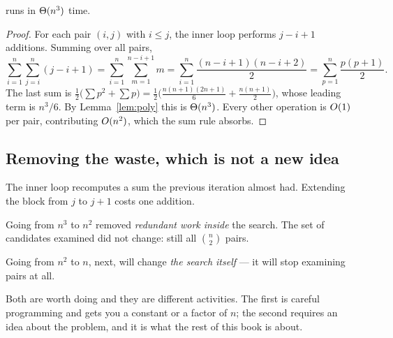 \begin{theorem}\label{thm:brute3}
 runs in $\Theta(n^{3})$ time.
\end{theorem}

\begin{proof}
For each pair $(i,j)$ with $i \le j$, the inner loop performs $j - i + 1$
additions. Summing over all pairs,
\[ \sum_{i=1}^{n}\sum_{j=i}^{n} (j-i+1)
   = \sum_{i=1}^{n}\sum_{m=1}^{n-i+1} m
   = \sum_{i=1}^{n} \frac{(n-i+1)(n-i+2)}{2}
   = \sum_{p=1}^{n} \frac{p(p+1)}{2}. \]
The last sum is $\tfrac12\bigl(\sum p^{2} + \sum p\bigr) =
\tfrac12\bigl(\tfrac{n(n+1)(2n+1)}{6} + \tfrac{n(n+1)}{2}\bigr)$, whose leading
term is $n^{3}/6$. By Lemma~\ref{lem:poly} this is $\Theta(n^{3})$. Every other
operation is $O(1)$ per pair, contributing $O(n^{2})$, which the sum
rule absorbs.
\end{proof}

\subsection*{Removing the waste, which is not a new idea}

The inner loop recomputes a sum the previous iteration almost had. Extending
the block from $j$ to $j+1$ costs one addition.


\begin{alertbox}
Going from $n^{3}$ to $n^{2}$ removed \emph{redundant work inside} the search.
The set of candidates examined did not change: still all $\binom{n}{2}$ pairs.

\smallskip
Going from $n^{2}$ to $n$, next, will change \emph{the search itself} --- it
will stop examining pairs at all.

\smallskip
Both are worth doing and they are different activities. The first is careful
programming and gets you a constant or a factor of $n$; the second requires an
idea about the problem, and it is what the rest of this book is about.
\end{alertbox}

